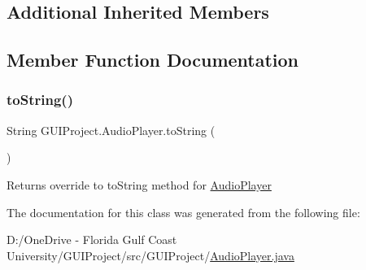 \subsection*{Additional Inherited Members}


\subsection{Member Function Documentation}
\mbox{\label{class_g_u_i_project_1_1_audio_player_a2935cc2da8c1ef1bbcf2c7566fafbc74}} 
\subsubsection{\texorpdfstring{toString()}{toString()}}
{\footnotesize\ttfamily String G\+U\+I\+Project.\+Audio\+Player.\+to\+String (\begin{DoxyParamCaption}{ }\end{DoxyParamCaption})}

\begin{DoxyReturn}{Returns}
override to to\+String method for \mbox{\hyperlink{class_g_u_i_project_1_1_audio_player}{Audio\+Player}} 
\end{DoxyReturn}


The documentation for this class was generated from the following file\+:\begin{DoxyCompactItemize}
\item 
D\+:/\+One\+Drive -\/ Florida Gulf Coast University/\+G\+U\+I\+Project/src/\+G\+U\+I\+Project/\mbox{\hyperlink{_audio_player_8java}{Audio\+Player.\+java}}\end{DoxyCompactItemize}

